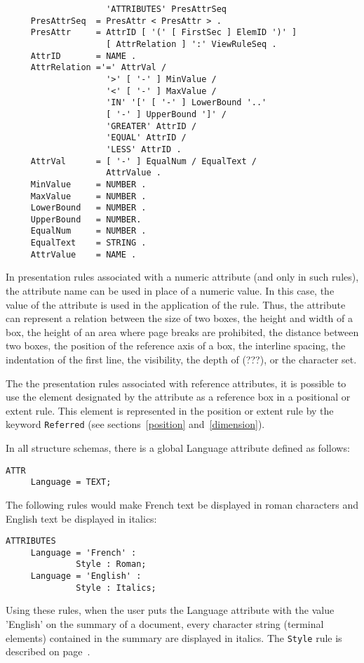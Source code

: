 \begin{verbatim}
                    'ATTRIBUTES' PresAttrSeq
     PresAttrSeq  = PresAttr < PresAttr > .
     PresAttr     = AttrID [ '(' [ FirstSec ] ElemID ')' ]
                    [ AttrRelation ] ':' ViewRuleSeq .
     AttrID       = NAME .
     AttrRelation ='=' AttrVal /
                    '>' [ '-' ] MinValue /
                    '<' [ '-' ] MaxValue /
                    'IN' '[' [ '-' ] LowerBound '..'
                    [ '-' ] UpperBound ']' /
                    'GREATER' AttrID /
                    'EQUAL' AttrID /
                    'LESS' AttrID .
     AttrVal      = [ '-' ] EqualNum / EqualText /
                    AttrValue .
     MinValue     = NUMBER .
     MaxValue     = NUMBER .
     LowerBound   = NUMBER .
     UpperBound   = NUMBER.
     EqualNum     = NUMBER .
     EqualText    = STRING .
     AttrValue    = NAME .
\end{verbatim}

In presentation rules associated with a numeric attribute (and only in
such rules), the attribute name can be used in place of a numeric
value.  In this case, the value of the attribute is used in the
application of the rule.  Thus, the attribute can represent a relation
between the size of two boxes, the height and width of a box, the
height of an area where page breaks are prohibited, the distance
between two boxes, the position of the reference axis of a box, the
interline spacing,  the indentation of the first line, the visibility,
the depth of (???), or the character set.

The the presentation rules associated with reference attributes, it is
possible to use the element designated by the attribute as a reference
box in a positional or extent rule.  This element is represented in the
position or extent rule by the keyword {\tt Referred} (see
sections~\ref{position} and~\ref{dimension}).

\begin{example}
In all structure schemas, there is a global Language attribute
defined as follows:

\begin{verbatim}
ATTR
     Language = TEXT;
\end{verbatim}
The following rules would make French text be displayed in roman
characters and English text be displayed in italics:

\begin{verbatim}
ATTRIBUTES
     Language = 'French' :
              Style : Roman;
     Language = 'English' :
              Style : Italics;
\end{verbatim}
Using these rules, when the user puts the Language attribute with the
value 'English' on the summary of a document, every character string
(terminal elements) contained in the summary are displayed in italics.
The {\tt Style} rule is described on page~\pageref{style}.
\end{example}

